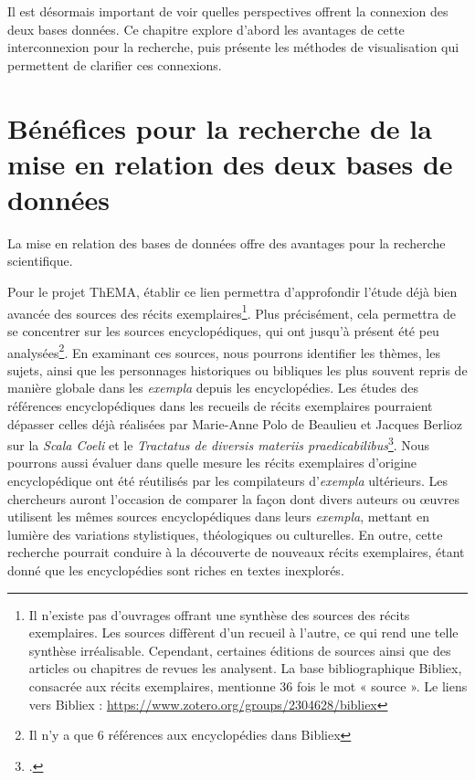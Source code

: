 Il est désormais important de voir quelles perspectives offrent la connexion des deux bases données. Ce chapitre explore d'abord les avantages de cette interconnexion pour la recherche, puis présente les méthodes de visualisation qui permettent de clarifier ces connexions.


\section{Bénéfices pour la recherche de la mise en relation des deux bases de données}
La mise en relation des bases de données offre des avantages pour la recherche scientifique.

Pour le projet ThEMA, établir ce lien permettra d'approfondir l'étude déjà bien avancée des sources des récits exemplaires\footnote{Il n'existe pas d'ouvrages offrant une synthèse des sources des récits exemplaires. Les sources diffèrent d'un recueil à l'autre, ce qui rend une telle synthèse irréalisable. Cependant, certaines éditions de sources ainsi que des articles ou chapitres de revues les analysent. La base bibliographique Bibliex, consacrée aux récits exemplaires, mentionne 36 fois le mot « source ». Le liens vers Bibliex : \url{https://www.zotero.org/groups/2304628/bibliex}}. Plus précisément, cela permettra de se concentrer sur les sources encyclopédiques, qui ont jusqu'à présent été peu analysées\footnote{Il n'y a que 6 références aux encyclopédies dans Bibliex}. En examinant ces sources, nous pourrons identifier les thèmes, les sujets, ainsi que les personnages historiques ou bibliques les plus souvent repris de manière globale dans les \textit{exempla} depuis les encyclopédies. Les études des références encyclopédiques dans les recueils de récits exemplaires pourraient dépasser celles déjà réalisées par Marie-Anne Polo de Beaulieu et Jacques Berlioz sur la \textit{Scala Coeli} et le \textit{Tractatus de diversis materiis praedicabilibus}\footcite{berliozRecueilsExemplaDiffusion1994}. Nous pourrons aussi évaluer dans quelle mesure les récits exemplaires d'origine encyclopédique ont été réutilisés par les compilateurs d'\textit{exempla} ultérieurs. Les chercheurs auront l'occasion de comparer la façon dont divers auteurs ou œuvres utilisent les mêmes sources encyclopédiques dans leurs \textit{exempla}, mettant en lumière des variations stylistiques, théologiques ou culturelles. En outre, cette recherche pourrait conduire à la découverte de nouveaux récits exemplaires, étant donné que les encyclopédies sont riches en textes inexplorés.

